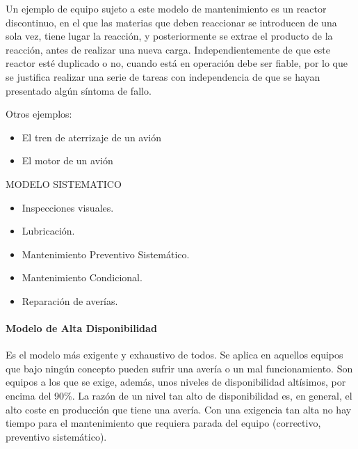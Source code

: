 \documentclass[../main]{subfiles}
\begin{document}
Un ejemplo de equipo sujeto a este modelo de mantenimiento es un reactor discontinuo, en el que las materias que deben reaccionar se introducen
de una sola vez, tiene lugar la reacción, y posteriormente se extrae el producto
de la reacción, antes de realizar una nueva carga. Independientemente de que
este reactor esté duplicado o no, cuando está en operación debe ser fiable, por
lo que se justifica realizar una serie de tareas con independencia de que se hayan presentado algún síntoma de fallo.

Otros ejemplos:
\begin{itemize}
    \item El tren de aterrizaje de un avión
    \item El motor de un avión
\end{itemize}

\begin{tcolorbox}
MODELO SISTEMATICO
\tcblower
\begin{itemize}
\item Inspecciones visuales.
\item Lubricación.
\item Mantenimiento Preventivo Sistemático.
\item Mantenimiento Condicional.
\item Reparación de averías.
\end{itemize}
\end{tcolorbox}

\paragraph{Modelo de Alta Disponibilidad}

Es el modelo más exigente y exhaustivo de todos. Se aplica en aquellos
equipos que bajo ningún concepto pueden sufrir una avería o un mal funcionamiento. Son equipos a los que se exige, además, unos niveles de disponibilidad altísimos, por encima del 90\%. La razón de un nivel tan alto de
disponibilidad es, en general, el alto coste en producción que tiene una avería. Con una exigencia tan alta no hay tiempo para el mantenimiento que requiera parada del equipo (correctivo, preventivo sistemático).

\end{document}

